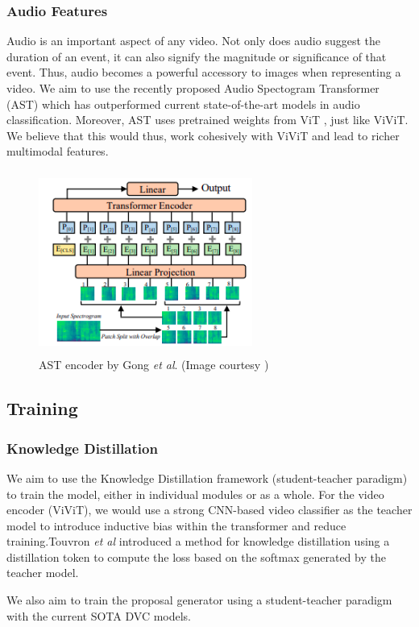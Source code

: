 \subsubsection{Audio Features}
\par Audio is an important aspect of any video. Not only does audio suggest the duration of an event, it can also signify the magnitude or significance of that event. Thus, audio becomes a powerful accessory to images when representing a video. We aim to use the recently proposed Audio Spectogram Transformer (AST) \cite{ast} which has outperformed current state-of-the-art models in audio classification. Moreover, AST uses pretrained weights from ViT \cite{vit}, just like ViViT. We believe that this would thus, work cohesively with ViViT and lead to richer multimodal features.

\begin{figure} [H]
	\centering
	\includegraphics[width=7cm, height=6cm] {assets/img/ast_methodology.png}
	\caption{AST encoder by Gong \textit{et al}. (Image courtesy \cite{ast})}
\end{figure}

\subsection{Training}
\subsubsection{Knowledge Distillation}
\par We aim to use the Knowledge Distillation framework (student-teacher paradigm) to train the model, either in individual modules or as a whole. For the video encoder (ViViT), we would use a strong CNN-based video classifier as the teacher model to introduce inductive bias within the transformer and reduce training.Touvron \textit{et al} introduced a method for knowledge distillation \cite{deit} using a distillation token to compute the loss based on the softmax generated by the teacher model. 
\par We also aim to train the proposal generator using a student-teacher paradigm with the current SOTA DVC models. 

